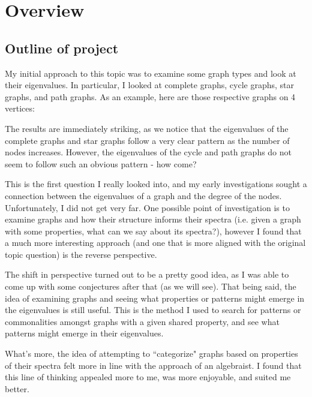 \documentclass{article}
\begin{document}
\textcolor{white}{\cite{dmc}}
\textcolor{white}{\cite{cat}}

\newpage
\section{Overview}
\subsection{Outline of project}

My initial approach to this topic was to examine some graph types and look at their eigenvalues.
In particular, I looked at complete graphs, cycle graphs, star graphs, and path graphs.
As an example, here are those respective graphs on 4 vertices:

\begin{figure}[ht]
\centering
{}
\end{figure}

The results are immediately striking, as we notice that the eigenvalues of the complete graphs and star graphs follow a very clear pattern as the number of nodes increases.
However, the eigenvalues of the cycle and path graphs do not seem to follow such an obvious pattern - how come?

This is the first question I really looked into, and my early investigations sought a connection between the eigenvalues of a graph and the degree of the nodes.
Unfortunately, I did not get very far.
One possible point of investigation is to examine graphs and how their structure informs their spectra (i.e. given a graph with some properties, what can we say about its spectra?),
however I found that a much more interesting approach (and one that is more aligned with the original topic question) is the reverse perspective.

The shift in perspective turned out to be a pretty good idea, as I was able to come up with some conjectures after that (as we will see).
That being said, the idea of examining graphs and seeing what properties or patterns might emerge in the eigenvalues is still useful.
This is the method I used to search for patterns or commonalities amongst graphs with a given shared property, and see what patterns might emerge in their eigenvalues.

What's more, the idea of attempting to ``categorize" graphs based on properties of their spectra felt more in line with the approach of an algebraist.
I found that this line of thinking appealed more to me, was more enjoyable, and suited me better.
\end{document}
